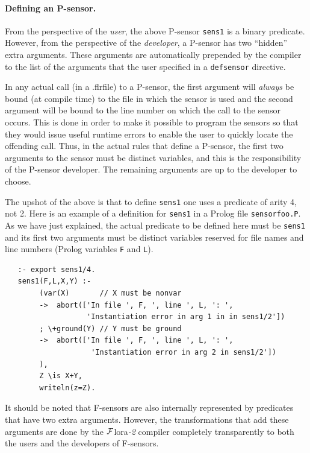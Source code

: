 \documentclass[11pt]{article}
\newcommand{\FLSYSTEM}{{\mbox{\sc ${\cal F}${lora}\rm\emph{-2}}}\xspace}
\newcommand{\flrext}{flr}
\begin{document}
\paragraph{Defining an P-sensor.}
From the perspective of the \emph{user}, the above P-sensor
\texttt{sens1} is
a binary predicate. However, 
from the perspective of the \emph{developer}, a P-sensor has two
``hidden'' extra arguments. These arguments 
are automatically prepended by the compiler to the list of the arguments
that the user specified in a \texttt{defsensor} directive. 

In any actual call (in a .\flrext file) to a P-sensor, the first argument will
\emph{always} be bound (at compile time) to the
file in which the sensor is used and the second 
argument will be bound to the line number
on which the call to the sensor occurs.
This is done in order to make it possible to program the sensors so that they
would issue useful runtime errors to
enable the user to quickly locate the offending call. 
Thus, in the actual rules that define a P-sensor,
the first two arguments to the sensor must be distinct variables, and this
is the responsibility of the P-sensor developer.
The remaining arguments are up to the developer to choose.

The upshot of the above is that
to define \texttt{sens1} one uses
a predicate of arity 4, not 2.  
Here is an example of a definition for \texttt{sens1} in a Prolog file
\texttt{sensorfoo.P}. As we have just
explained, the actual predicate to be defined here must be \texttt{sens1}
and its first two arguments must be distinct variables 
reserved for file names and line numbers
(Prolog variables \texttt{F} and \texttt{L}).  
\begin{verbatim}
   :- export sens1/4.
   sens1(F,L,X,Y) :-
        (var(X)       // X must be nonvar
        ->  abort(['In file ', F, ', line ', L, ': ',
                   'Instantiation error in arg 1 in in sens1/2'])
        ; \+ground(Y) // Y must be ground
        ->  abort(['In file ', F, ', line ', L, ': ',
                    'Instantiation error in arg 2 in sens1/2'])
        ),
        Z \is X+Y,
        writeln(z=Z).
\end{verbatim}

It should be noted that F-sensors are also internally represented by
predicates that have two extra arguments. However, the transformations that
add these arguments are done by the \FLSYSTEM compiler completely
transparently to both the users and the developers of F-sensors.
\end{document}
